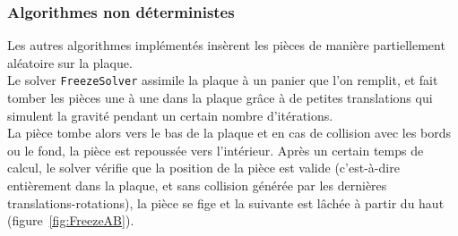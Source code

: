 \subsubsection{Algorithmes non déterministes}

Les autres algorithmes implémentés insèrent les pièces de manière partiellement aléatoire sur la plaque.\\

Le solver \texttt{FreezeSolver} assimile la plaque à un panier que l'on remplit, et fait tomber les pièces une à une dans la plaque grâce à de petites translations qui simulent la gravité pendant un certain nombre d'itérations.\\
\indent La pièce tombe alors vers le bas de la plaque et en cas de collision avec les bords ou le fond, la pièce est repoussée vers l'intérieur. Après un certain temps de calcul, le solver vérifie que la position de la pièce est valide (c'est-à-dire entièrement dans la plaque, et sans collision générée par les dernières translations-rotations), la pièce se fige et la suivante est lâchée à partir du haut (figure~\ref{fig:FreezeAB}).\\

